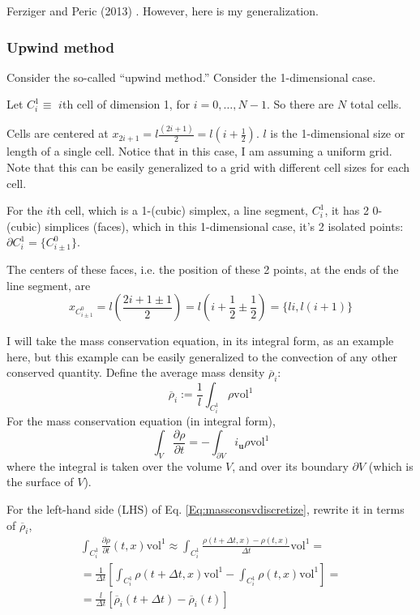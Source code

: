 \documentclass[10pt]{amsart}
\begin{document}
\begin{multicols*}{2}
Ferziger and Peric (2013) \cite{JFMP2013}.  However, here is my generalization.

\subsubsection{Upwind method}

Consider the so-called ``upwind method.''  Consider the 1-dimensional case.

Let $C_i^1 \equiv $ $i$th cell of dimension 1, for $i = 0, \dots , N-1$.  So there are $N$ total cells.

Cells are centered at $x_{2i+1} = l \frac{ (2i+1)}{2} = l(i + \frac{1}{2})$.  $l$ is the 1-dimensional size or length of a single cell.  Notice that in this case, I am assuming a uniform grid.  Note that this can be easily generalized to a grid with different cell sizes for each cell.  

For the $i$th cell, which is a 1-(cubic) simplex, a line segment, $C_i^1$, it has 2 $0$-(cubic) simplices (faces), which in this 1-dimensional case, it's 2 isolated points: $\partial C_i^1 = \lbrace C^0_{i \pm 1} \rbrace$.

The centers of these faces, i.e. the position of these 2 points, at the ends of the line segment, are
\[
x_{C^0_{i \pm 1} } = l \left( \frac{2i  +1 \pm 1 }{2} \right) = l ( i + \frac{1}{2} \pm \frac{1}{2} ) = \lbrace li, l(i+1) \rbrace
\]

I will take the mass conservation equation, in its integral form, as an example here, but this example can be easily generalized to the convection of any other conserved quantity.  Define the average mass density $\overline{\rho}_i$:
\begin{equation}
  \overline{\rho}_i := \frac{1}{l} \int_{C_i^1} \rho \text{vol}^1
\end{equation}
For the mass conservation equation (in integral form),
\begin{equation}\label{Eq:massconsvdiscretize}
\int_V  \frac{ \partial \rho}{ \partial t} = - \int_{\partial V} i_{\mathbf{u}}\rho \text{vol}^1
  \end{equation}
where the integral is taken over the volume $V$, and over its boundary $\partial V$ (which is the surface of $V$).

For the left-hand side (LHS) of Eq. \ref{Eq:massconsvdiscretize}, rewrite it in terms of $\overline{\rho}_i$,
\[
\begin{gathered}
  \int_{C_i^1} \frac{  \partial \rho}{ \partial t}(t,x) \text{vol}^1 \approx \int_{C_i^1} \frac{ \rho(t+\Delta t, x) - \rho(t,x) }{ \Delta t} \text{vol}^1 = \\
  = \frac{1}{ \Delta t} \left[ \int_{C_i^1} \rho(t+\Delta t,x) \text{vol}^1 - \int_{C_i^1} \rho(t,x) \text{vol}^1 \right] = \\
  = \frac{l}{\Delta t} \left[ \overline{\rho}_i(t+\Delta t) - \overline{\rho}_i(t) \right]
  \end{gathered}
\]


\end{multicols*}
\end{document}
